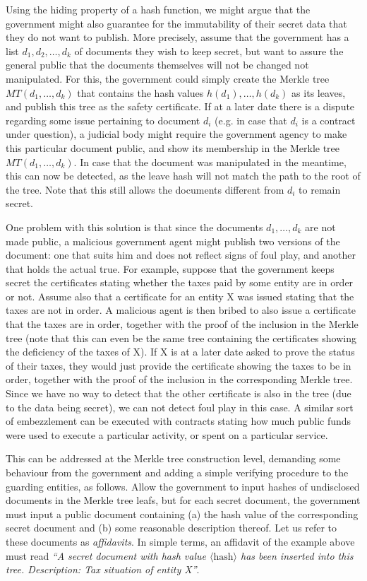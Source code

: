 

Using the hiding property of a hash function, we might argue that the government might also guarantee for the immutability of their secret data that they do not want to publish. More precisely, assume that the government has a list $d_1,d_2,\ldots ,d_k$ of documents they wish to keep secret, but want to assure the general public that the documents themselves will not be changed not manipulated. For this, the government could simply create the Merkle tree $MT(d_1,\ldots ,d_k)$ that contains the hash values $h(d_1),\ldots ,h(d_k)$ as its leaves, and publish this tree as the safety certificate. If at a later date there is a dispute regarding some issue pertaining to document $d_i$ (e.g. in case that $d_i$ is a contract under question), a judicial body might require the government agency to make this particular document public, and show its membership in the Merkle tree $MT(d_1,\ldots ,d_k)$. In case that the document was manipulated in the meantime, this can now be detected, as the leave hash will not match the path to the root of the tree. Note that this still allows the documents different from $d_i$ to remain secret.

One problem with this solution is that since the documents $d_1,\ldots ,d_k$ are not made public, a malicious government agent might publish two versions of the document: one that suits him and does not reflect signs of foul play, and another that holds the actual true. For example, suppose that the government keeps secret the certificates stating whether the taxes paid by some entity are in order or not. Assume also that a certificate for an entity X was issued stating that the taxes are not in order. A malicious agent is then bribed to also issue a certificate that the taxes are in order, together with the proof of the inclusion in the Merkle tree (note that this can even be the same tree containing the certificates showing the deficiency of the taxes of X). If X is at a later date asked to prove the status of their taxes, they would just provide the certificate showing the taxes to be in order, together with the proof of the inclusion in the corresponding Merkle tree. Since we have no way to detect that the other certificate is also in the tree (due to the data being secret), we can not detect foul play in this case. A similar sort of embezzlement can be executed with contracts stating how much public funds were used to execute a particular activity, or spent on a particular service.

This can be addressed at the Merkle tree construction level, demanding some behaviour from the government and adding a simple verifying procedure to the guarding entities, as follows. Allow the government to input hashes of undisclosed documents in the Merkle tree leafs, but for each secret document, the government must input a public document containing (a) the hash value of the corresponding secret document and (b) some reasonable description thereof. Let us refer to these documents as \textit{affidavits}. In simple terms, an affidavit of the example above must read \textit{``A secret document with hash value $\langle \mbox{hash}\rangle$ has been inserted into this tree. Description: Tax situation of entity X''}. 

